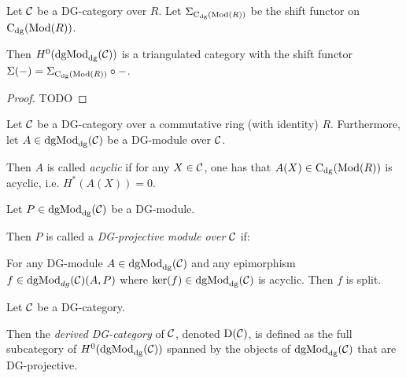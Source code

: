 \begin{theorem}
    Let \( {\mathcal{C}} \) be a DG-category over \( R \). Let \( \Sigma_{\operatorname{C}_{\operatorname{dg}}(\operatorname{Mod}(R))} \) be the shift functor on \( \operatorname{C}_{\operatorname{dg}}(\operatorname{Mod}(R)) \).

    Then \( H^0(\operatorname{dgMod}_{\operatorname{dg}}({\mathcal{C}})) \) is a triangulated category with the shift functor \( \Sigma(-) = \Sigma_{\operatorname{C}_{\operatorname{dg}}(\operatorname{Mod}(R))} \circ - \).
\end{theorem}
\begin{proof}
    TODO
\end{proof}


\begin{definition}
    Let \( {\mathcal{C}} \) be a DG-category over a commutative ring (with identity) \( R \). Furthermore, let \( A \in \operatorname{dgMod}_{\operatorname{dg}}({\mathcal{C}}) \) be a DG-module over \( {\mathcal{C}} \).

    Then \( A \) is called \emph{acyclic} if for any \( X \in {\mathcal{C}} \), one has that \( A(X) \in \operatorname{C}_{\operatorname{dg}}(\operatorname{Mod}(R)) \) is acyclic, i.e. \( H^*(A(X)) = 0 \).
\end{definition}

\begin{definition}
    Let \( P \in \operatorname{dgMod}_{\operatorname{dg}}({\mathcal{C}}) \) be a DG-module.

    Then \( P \) is called a \emph{DG-projective module over \( {\mathcal{C}} \)} if:
    
    For any DG-module \( A \in \operatorname{dgMod}_{\operatorname{dg}}({\mathcal{C}}) \) and any epimorphism \( f \in \operatorname{dgMod}_{dg}({\mathcal{C}})(A, P) \) where \( \ker(f) \in \operatorname{dgMod}_{\operatorname{dg}}({\mathcal{C}}) \) is acyclic. Then \( f \) is split.
\end{definition}

\begin{definition}
    Let \( {\mathcal{C}} \) be a DG-category.

    Then the \emph{derived DG-category} of \( {\mathcal{C}} \), denoted \( \operatorname{D}({\mathcal{C}}) \), is defined as the full subcategory of \( H^0(\operatorname{dgMod}_{\operatorname{dg}}({\mathcal{C}})) \) spanned by the objects of \( \operatorname{dgMod}_{\operatorname{dg}}({\mathcal{C}}) \) that are DG-projective.
\end{definition}

